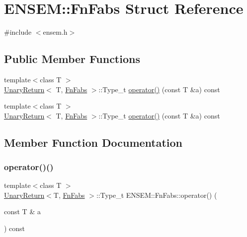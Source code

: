 \hypertarget{structENSEM_1_1FnFabs}{}\section{E\+N\+S\+EM\+:\+:Fn\+Fabs Struct Reference}
\label{structENSEM_1_1FnFabs}


{\ttfamily \#include $<$ensem.\+h$>$}

\subsection*{Public Member Functions}
\begin{DoxyCompactItemize}
\item 
{\footnotesize template$<$class T $>$ }\\\mbox{\hyperlink{structENSEM_1_1UnaryReturn}{Unary\+Return}}$<$ T, \mbox{\hyperlink{structENSEM_1_1FnFabs}{Fn\+Fabs}} $>$\+::Type\+\_\+t \mbox{\hyperlink{structENSEM_1_1FnFabs_a655393f2e089d6fb5f266991b83ffb12}{operator()}} (const T \&a) const
\item 
{\footnotesize template$<$class T $>$ }\\\mbox{\hyperlink{structENSEM_1_1UnaryReturn}{Unary\+Return}}$<$ T, \mbox{\hyperlink{structENSEM_1_1FnFabs}{Fn\+Fabs}} $>$\+::Type\+\_\+t \mbox{\hyperlink{structENSEM_1_1FnFabs_a655393f2e089d6fb5f266991b83ffb12}{operator()}} (const T \&a) const
\end{DoxyCompactItemize}


\subsection{Member Function Documentation}
\mbox{\label{structENSEM_1_1FnFabs_a655393f2e089d6fb5f266991b83ffb12}} 
\subsubsection{\texorpdfstring{operator()()}{operator()()}\hspace{0.1cm}{\footnotesize\ttfamily [1/2]}}
{\footnotesize\ttfamily template$<$class T $>$ \\
\mbox{\hyperlink{structENSEM_1_1UnaryReturn}{Unary\+Return}}$<$T, \mbox{\hyperlink{structENSEM_1_1FnFabs}{Fn\+Fabs}} $>$\+::Type\+\_\+t E\+N\+S\+E\+M\+::\+Fn\+Fabs\+::operator() (\begin{DoxyParamCaption}\item[{const T \&}]{a }\end{DoxyParamCaption}) const\hspace{0.3cm}{\ttfamily [inline]}}

